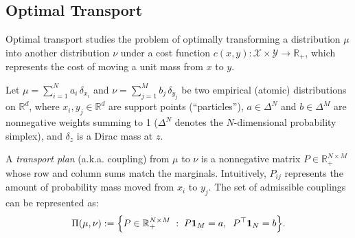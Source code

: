 
\subsection{Optimal Transport}\label{subsec:ot}


Optimal transport \citep{peyre2020computationaloptimaltransport} studies the problem of optimally transforming a distribution $\mu$ into another distribution $\nu$ under a cost function
$c(x,y) : \mathcal{X} \times \mathcal{Y} \to \mathbb{R}_+$, which represents the cost of moving a unit mass from $x$ to $y$.

Let $\mu = \sum_{i=1}^N a_i\,\delta_{x_i}$ and $\nu = \sum_{j=1}^M b_j\,\delta_{y_j}$ be two empirical (atomic) distributions on $\mathbb{R}^{d}$, where $x_i, y_j \in \mathbb{R}^d$ are support points (“particles”), $a \in \Delta^N$ and $b \in \Delta^M$ are nonnegative weights summing to 1 ($\Delta^N$ denotes the $N$-dimensional probability simplex), and $\delta_z$ is a Dirac mass at $z$.

A \emph{transport plan} (a.k.a. coupling) from $\mu$ to $\nu$ is a nonnegative matrix $P \in \mathbb{R}_+^{N \times M}$ whose row and column sums match the marginals. Intuitively, $P_{ij}$ represents the amount of probability mass moved from $x_i$ to $y_j$. The set of admissible couplings can be represented as:
\begin{equation}
  \Pi(\mu,\nu) := \Bigl\{ P \in \mathbb{R}_+^{N \times M} \;:\; P \mathbf{1}_M = a, \;\; P^\top \mathbf{1}_N = b \Bigr\}.
  \label{eq:transport-plans}
\end{equation}

